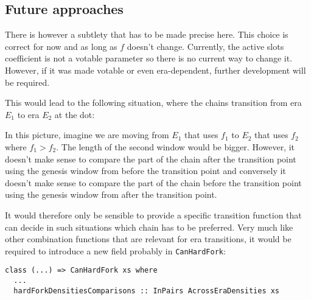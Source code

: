 \subsection{Future approaches}

There is however a subtlety that has to be made precise here. This choice is
correct for now and as long as $f$ doesn't change. Currently, the active slots
coefficient is not a votable parameter so there is no current way to change it.
However, if it was made votable or even era-dependent, further development will
be required.

This would lead to the following situation, where the chains transition from era
$E_1$ to era $E_2$ at the dot:

\begin{center}
\end{center}

In this picture, imagine we are moving from $E_1$ that uses $f_1$ to $E_2$
that uses $f_2$ where $f_1 > f_2$. The length of the second window would be
bigger. However, it doesn't make sense to compare the part of the chain after
the transition point using the genesis window from before the transition point
and conversely it doesn't make sense to compare the part of the chain before the
transition point using the genesis window from after the transition point.

It would therefore only be sensible to provide a specific transition function
that can decide in such situations which chain has to be preferred. Very much
like other combination functions that are relevant for era transitions, it would
be required to introduce a new field probably in \lstinline!CanHardFork!:

\begin{lstlisting}
class (...) => CanHardFork xs where
  ...
  hardForkDensitiesComparisons :: InPairs AcrossEraDensities xs
\end{lstlisting}

